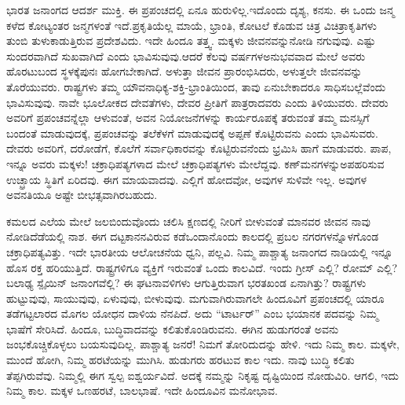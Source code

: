 ಭಾರತ ಜನಾಂಗದ ಆದರ್ಶ ಮುಕ್ತಿ. ಈ ಪ್ರಪಂಚದಲ್ಲಿ ಏನೂ ಹುರುಳಿಲ್ಲ.\break ಇದೊಂದು ದೃಶ್ಯ, ಕನಸು. ಈ ಒಂದು ಜನ್ಮ ಕಳೆದ ಕೋಟ್ಯಂತರ ಜನ್ಮಗಳಂತೆ ಇದೆ.\break ಪ್ರಕೃತಿಯೆಲ್ಲ ಮಾಯೆ, ಭ್ರಾಂತಿ, ಕೋಟಲೆ ಕೊಡುವ ಚಿತ್ರ ವಿಚಿತ್ರಾಕೃತಿಗಳು ತುಂಬಿ ತುಳುಕಾಡುತ್ತಿರುವ ಪ್ರದೇಶವಿದು. ಇದೇ ಹಿಂದೂ ತತ್ತ್ವ. ಮಕ್ಕಳು ಜೀವನವನ್ನು\break ನೋಡಿ ನಗುವುವು. ಎಷ್ಟು ಸುಂದರವಾಗಿದೆ ಸುಖವಾಗಿದೆ ಎಂದು ಭಾವಿಸುವುವು.\break ಆದರೆ ಕೆಲವು ವರ್ಷಗಳಅನುಭವವಾದ ಮೇಲೆ ಅವರು ಹೊರಟುಬಂದ ಸ್ಥಳಕ್ಕೆ\break ಪುನಃ ಹೋಗಬೇಕಾಗಿದೆ. ಅಳುತ್ತಾ ಜೀವನ ಪ್ರಾರಂಭಿಸಿದರು, ಅಳುತ್ತಲೇ ಜೀವನ\-ವನ್ನು ತೊರೆಯುವರು. ರಾಷ್ಟ್ರಗಳು ತಮ್ಮ ಯೌವನಾಧಿಕ್ಯ-ಶಕ್ತಿ-ಭ್ರಾಂತಿಯಿಂದ, ತಾವು ಏನುಬೇಕಾದರೂ ಸಾಧಿಸಬಲ್ಲೆವೆಂದು ಭಾವಿಸುವುವು. ನಾವೇ ಭೂಲೋಕದ ದೇವತೆಗಳು, ದೇವರ ಪ್ರೀತಿಗೆ ಪಾತ್ರರಾದವರು ಎಂದು ತಿಳಿಯುವರು. ದೇವರು ಅವರಿಗೆ ಪ್ರಪಂಚವನ್ನೆಲ್ಲಾ ಆಳುವಂತೆ, ಅವನ ನಿಯೋಜನೆಗಳನ್ನು ಕಾರ್ಯರೂಪಕ್ಕೆ ತರುವಂತೆ ತಮ್ಮ ಮನಸ್ಸಿಗೆ ಬಂದಂತೆ ಮಾಡುವುದಕ್ಕೆ, ಪ್ರಪಂಚವನ್ನು ತಲೆಕೆಳಗೆ ಮಾಡುವುದಕ್ಕೆ ಅಪ್ಪಣೆ ಕೊಟ್ಟಿರುವನು ಎಂದು ಭಾವಿಸುವರು. ದೇವರು ಅವರಿಗೆ, ದರೋಡೆಗೆ, ಕೊಲೆಗೆ ಸರ್ವಾಧಿಕಾರವನ್ನು ಕೊಟ್ಟಿರುವನೆಂದು ಭ್ರಮಿಸಿ ಹಾಗೆ ಮಾಡುವರು. ಪಾಪ, ಇನ್ನೂ ಅವರು ಮಕ್ಕಳು! ಚಕ್ರಾಧಿಪತ್ಯಗಳಾದ ಮೇಲೆ ಚಕ್ರಾಧಿಪತ್ಯಗಳು ಮೇಲೆದ್ದವು. ಕಣ್​ಮನಗಳನ್ನು\break ಅಪಹರಿಸುವ ಉಚ್ಛ್ರಾಯ ಸ್ಥಿತಿಗೆ ಏರಿದವು. ಈಗ ಮಾಯವಾದವು. ಎಲ್ಲಿಗೆ ಹೋದವೋ, ಅವುಗಳ ಸುಳಿವೇ ಇಲ್ಲ. ಅವುಗಳ ಅವನತಿಯೂ ಅಷ್ಟೇ ಬೀಭತ್ಸವಾಗಿರಬಹುದು.

ಕಮಲದ ಎಲೆಯ ಮೇಲೆ ಜಲಬಿಂದುವೊಂದು ಚಲಿಸಿ ಕ್ಷಣದಲ್ಲಿ ನೀರಿಗೆ ಬೀಳುವಂತೆ ಮಾನವರ ಜೀವನ ನಾವು ನೋಡಿದೆಡೆಯಲ್ಲಿ ನಾಶ. ಈಗ ದಟ್ಟಕಾನನವಿರುವ ಕಡೆ\break ಒಂದಾನೊಂದು ಕಾಲದಲ್ಲಿ ಪ್ರಬಲ ನಗರಗಳನ್ನೊಳಗೊಂಡ ಚಕ್ರಾಧಿಪತ್ಯವಿತ್ತು. ಇದೇ ಭಾರತೀಯ ಆಲೋಚನೆಯ ಧ್ವನಿ, ಪಲ್ಲವಿ. ನಿಮ್ಮ ಪಾಶ್ಚಾತ್ಯ ಜನಾಂಗದ ನಾಡಿಯಲ್ಲಿ ಇನ್ನೂ ಹೊಸ ರಕ್ತ ಹರಿಯುತ್ತಿದೆ. ರಾಷ್ಟ್ರಗಳಿಗೂ ವ್ಯಕ್ತಿಗೆ ಇರುವಂತೆ ಒಂದು ಕಾಲವಿದೆ. ಇಂದು ಗ್ರೀಸ್​ ಎಲ್ಲಿ? ರೋಮ್​ ಎಲ್ಲಿ? ಬಲಾಢ್ಯ ಸ್ಪೈಯಿನ್​ ಜನಾಂಗವೆಲ್ಲಿ? ಈ ಘಟನಾವಳಿಗಳು ಆಗುತ್ತಿರುವಾಗ ಭರತಖಂಡ ಏನಾಗಿತ್ತು? ರಾಷ್ಟ್ರಗಳು ಹುಟ್ಟುವುವು, ಸಾಯುವುವು, ಏಳುವುವು, ಬೀಳುವುವು. ಮಗುವಾಗಿರುವಾಗಲೇ ಹಿಂದೂವಿಗೆ ಪ್ರಪಂಚದಲ್ಲಿ ಯಾರೂ ತಡೆಗಟ್ಟಲಾರದ ಮೊಗಲ ಯೋಧನ ದಾಳಿಯ ನೆನಪಿದೆ. ಅದು “ಟಾರ್ಟರ್​” ಎಂಬ ಭಯಾನಕ ಪದವನ್ನು ನಿಮ್ಮ ಭಾಷೆಗೆ ಸೇರಿಸಿದೆ. ಹಿಂದೂ, ಬುದ್ಧಿವಾದವನ್ನು ಕಲಿತುಕೊಂಡಿರುವನು. ಈಗಿನ ಹುಡುಗರಂತೆ ಅವನು ಜಂಭಕೊಚ್ಚಿಕೊಳ್ಳಲು ಬಯಸುವುದಿಲ್ಲ. ಪಾಶ್ಚಾತ್ಯ ಜನರೆ! ನಿಮಗೆ ತೋರಿದುದನ್ನು ಹೇಳಿ. ಇದು ನಿಮ್ಮ ಕಾಲ. ಮಕ್ಕಳೇ, ಮುಂದೆ ಹೋಗಿ, ನಿಮ್ಮ ಹರಟೆಯನ್ನು ಮುಗಿಸಿ. ಹುಡುಗರು ಹರಟುವ ಕಾಲ ಇದು. ನಾವು ಬುದ್ಧಿ ಕಲಿತು ತೆಪ್ಪಗಿರುವೆವು. ನಿಮ್ಮಲ್ಲಿ ಈಗ ಸ್ವಲ್ಪ ಐಶ್ವರ್ಯವಿದೆ. ಅದಕ್ಕೆ ನಮ್ಮನ್ನು ನಿಕೃಷ್ಟ ದೃಷ್ಟಿಯಿಂದ ನೋಡುವಿರಿ. ಆಗಲಿ, ಇದು ನಿಮ್ಮ ಕಾಲ. ಮಕ್ಕಳ ಒಣಹರಟೆ, ಬಾಲಭಾಷೆ. ಇದೇ ಹಿಂದೂವಿನ ಮನೋಭಾವ.

